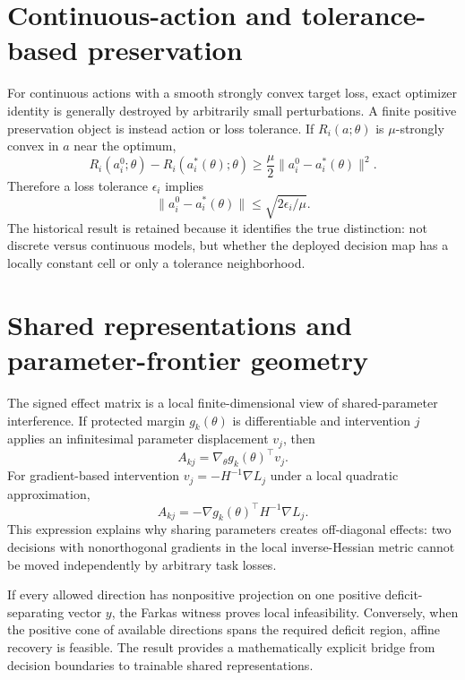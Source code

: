 \documentclass[11pt,letterpaper]{article}
\theoremstyle{plain}
\newcommand{\1}{\mathbf 1}
\begin{document}
\clearpage
\section{Continuous-action and tolerance-based preservation}
For continuous actions with a smooth strongly convex target loss, exact optimizer identity is generally destroyed by arbitrarily small perturbations. A finite positive preservation object is instead action or loss tolerance. If $R_i(a;\theta)$ is $\mu$-strongly convex in $a$ near the optimum,
\begin{equation}
 R_i(a_i^0;\theta)-R_i(a_i^*(\theta);\theta)\ge\frac{\mu}{2}\|a_i^0-a_i^*(\theta)\|^2.
\end{equation}
Therefore a loss tolerance $\epsilon_i$ implies
\begin{equation}
 \|a_i^0-a_i^*(\theta)\|\le\sqrt{2\epsilon_i/\mu}.
\end{equation}
The historical result is retained because it identifies the true distinction: not discrete versus continuous models, but whether the deployed decision map has a locally constant cell or only a tolerance neighborhood.

\clearpage
\section{Shared representations and parameter-frontier geometry}
The signed effect matrix is a local finite-dimensional view of shared-parameter interference. If protected margin $g_k(\theta)$ is differentiable and intervention $j$ applies an infinitesimal parameter displacement $v_j$, then
\begin{equation}
 A_{kj}=\nabla_\theta g_k(\theta)^\top v_j.
\end{equation}
For gradient-based intervention $v_j=-H^{-1}\nabla L_j$ under a local quadratic approximation,
\begin{equation}
 A_{kj}=-\nabla g_k(\theta)^\top H^{-1}\nabla L_j.
\end{equation}
This expression explains why sharing parameters creates off-diagonal effects: two decisions with nonorthogonal gradients in the local inverse-Hessian metric cannot be moved independently by arbitrary task losses.

If every allowed direction has nonpositive projection on one positive deficit-separating vector $y$, the Farkas witness proves local infeasibility. Conversely, when the positive cone of available directions spans the required deficit region, affine recovery is feasible. The result provides a mathematically explicit bridge from decision boundaries to trainable shared representations.
\end{document}

